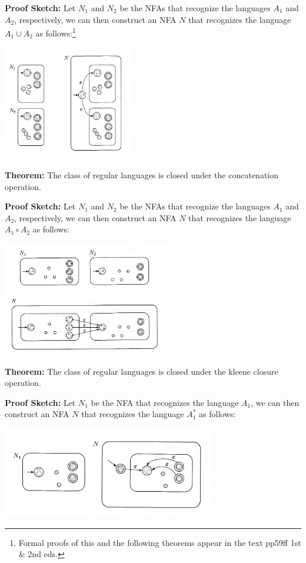 \documentclass[a4paper,blends,pdf,colorBG,slideColor]{prosper}
\begin{document}
{\bf Proof Sketch:} Let $N_1$ and $N_2$ be the NFAs that recognize the languages $A_1$ and
$A_2$, respectively, we can then construct an NFA $N$ that recognizes the language
$A_1 \cup A_2$ as follows:\footnote{Formal proofs of this and the following theorems 
appear in the text pp59ff 1st \& 2nd eds.}

\begin{center}
\includegraphics[height=50mm]{images/nfa-union.eps}
\end{center}
\es

{\bf Theorem:} The class of regular languages is closed under the concatenation operation.

{\bf Proof Sketch:} Let $N_1$ and $N_2$ be the NFAs that recognize the languages $A_1$ and
$A_2$, respectively, we can then construct an NFA $N$ that recognizes the language
$A_1 \circ A_2$ as follows:

\begin{center}
\includegraphics[height=50mm]{images/nfa-concat.eps}
\end{center}
\es

{\bf Theorem:} The class of regular languages is closed under the kleene closure operation.

{\bf Proof Sketch:} Let $N_1$ be the NFA that recognizes the language $A_1$, we can then construct an NFA $N$ that recognizes the language
$A_1^*$ as follows:

\begin{center}
\includegraphics[height=40mm]{images/nfa-kleene.eps}
\end{center}
\es
\end{document}
